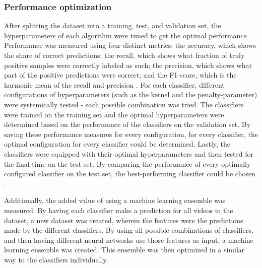 \documentclass[../main.tex]{subfiles}
\begin{document}
\subsubsection{Performance optimization}
After splitting the dataset into a training, test, and validation set, the hyperparameters of each
algorithm were tuned to get the optimal performance \citep{feurer2019hyperparameter}. Performance was
measured using four distinct metrics: the accuracy, which shows the share of correct predictions; the
recall, which shows what fraction of truly positive samples were correctly labeled as such; the
precision, which shows what part of the positive predictions were correct; and the F1-score, which is
the harmonic mean of the recall and precision \citep{sokolova2009systematic}. For each classifier,
different configurations of hyperparameters (such as the kernel and the penalty-parameter) were
systemically tested - each possible combination was tried. The classifiers were trained on the training set
and the optimal hyperparameters were determined based on the performance of the classifiers on the validation
set. By saving these performance measures for every configuration, for every classifier, the optimal
configuration for every classifier could be determined. Lastly, the classifiers were equipped with their
optimal hyperparameters and then tested for the final time on the test set. By comparing the performance
of every optimally configured classifier on the test set, the best-performing classifier could be chosen
\citep{reitermanova2010data}. 

Additionally, the added value of using a machine learning ensemble was measured. By having each
classifier make a prediction for all videos in the dataset, a new dataset was created, wherein the
features were the predictions made by the different classifiers. By using all possible combinations of
classifiers, and then having different neural networks use those features as input, a machine learning
ensemble was created. This ensemble was then optimized in a similar way to the classifiers individually.
\end{document}
